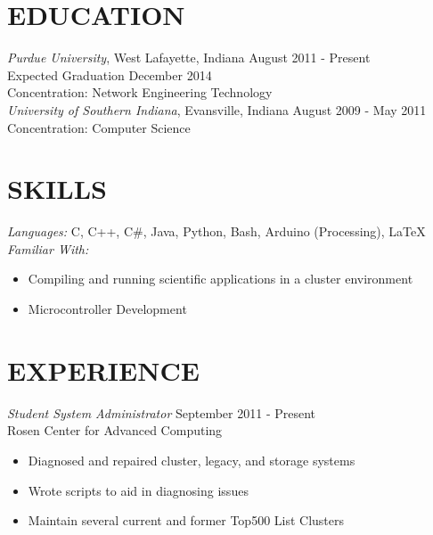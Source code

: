 \documentclass[line,margin]{res}
\begin{document}
\address{maddene@purdue.edu}
\address{(812) 250-1419}
 
\begin{resume}
\section{EDUCATION} 

				{\sl Purdue University}, West Lafayette, Indiana \hfill August 2011 - Present \\
                Expected Graduation December 2014 \\
                Concentration: Network Engineering Technology \\ 
                
                {\sl University of Southern Indiana}, Evansville, Indiana \hfill August 2009 - May 2011 \\
                Concentration: Computer Science\\
                
 
\section{SKILLS} 
				{\sl Languages:}  C, C++, C\#, Java, Python, Bash, Arduino (Processing), \LaTeX \\
				{\sl Familiar With:} 
                \begin{itemize} \itemsep -2pt %
                  \item Compiling and running scientific applications in a cluster environment
                  \item Microcontroller Development
                \end{itemize}
 
\section{EXPERIENCE} 
				{\sl Student System Administrator} \hfill September 2011 - Present \\
                Rosen Center for Advanced Computing
                \begin{itemize}  \itemsep -2pt %
                  \item Diagnosed and repaired cluster, legacy, and storage systems
                  \item Wrote scripts to aid in diagnosing issues
                  \item Maintain several current and former Top500 List Clusters
                \end{itemize}


\end{resume}
\end{document}
